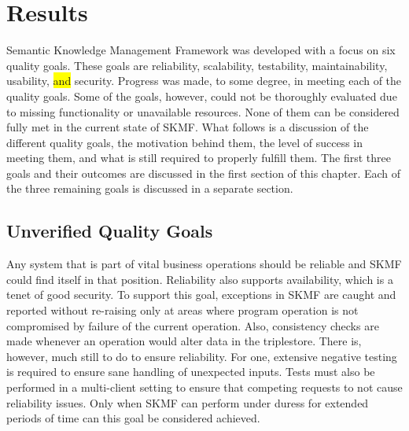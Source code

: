 \chapter{Results}
\label{result}

Semantic Knowledge Management Framework was developed with a focus on six quality goals. These goals are reliability, scalability, testability, maintainability, usability,
\colorbox{yellow}{and}
security. Progress was made, to some degree, in meeting each of the quality goals. Some of the goals, however, could not be thoroughly evaluated due to missing functionality or unavailable resources. None of them can be considered fully met in the current state of SKMF. What follows is a discussion of the different quality goals, the motivation behind them, the level of success in meeting them, and what is still required to properly fulfill them. The first three goals and their outcomes are discussed in the first section of this chapter. Each of the three remaining goals is discussed in a separate section.


\section{Unverified Quality Goals}
\label{result:unverified}

Any system that is part of vital business operations should be reliable and SKMF could find itself in that position. Reliability also supports availability, which is a tenet of good security. To support this goal, exceptions in SKMF are caught and reported without re-raising only at areas where program operation is not compromised by failure of the current operation. Also, consistency checks are made whenever an operation would alter data in the triplestore. There is, however, much still to do to ensure reliability. For one, extensive negative testing is required to ensure sane handling of unexpected inputs. Tests must also be performed in a multi-client setting to ensure that competing requests to not cause reliability issues. Only when SKMF can perform under duress for extended periods of time can this goal be considered achieved.

